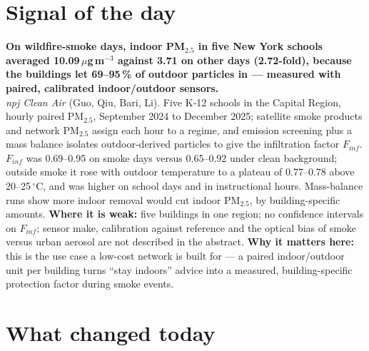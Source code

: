 \documentclass[10pt]{article}
\begin{document}
\vspace{6mm}

\section*{\sffamily\bfseries\color{Deep}Signal of the day}
\vspace{-1.5mm}{\color{Amber}\rule{\linewidth}{1.1pt}}\vspace{2.5mm}

\begin{keybox}
{\sffamily\bfseries\small\color{Deep}On wildfire-smoke days, indoor PM$_{2.5}$ in five New York schools averaged 10.09\,$\mu$g\,m$^{-3}$ against 3.71 on other days (2.72-fold), because the buildings let 69--95\,\% of outdoor particles in --- measured with paired, calibrated indoor/outdoor sensors.}\\[1.4mm]
\footnotesize
\textit{npj Clean Air} (Guo, Qiu, Bari, Li). Five K-12 schools in the Capital Region, hourly paired PM$_{2.5}$, September 2024 to December 2025; satellite smoke products and network PM$_{2.5}$ assign each hour to a regime, and emission screening plus a mass balance isolates outdoor-derived particles to give the infiltration factor $F_{inf}$. $F_{inf}$ was 0.69--0.95 on smoke days versus 0.65--0.92 under clean background; outside smoke it rose with outdoor temperature to a plateau of 0.77--0.78 above 20--25\,$^\circ$C, and was higher on school days and in instructional hours. Mass-balance runs show more indoor removal would cut indoor PM$_{2.5}$, by building-specific amounts.
\textbf{Where it is weak:} five buildings in one region; no confidence intervals on $F_{inf}$; sensor make, calibration against reference and the optical bias of smoke versus urban aerosol are not described in the abstract.
\textbf{Why it matters here:} this is the use case a low-cost network is built for --- a paired indoor/outdoor unit per building turns ``stay indoors'' advice into a measured, building-specific protection factor during smoke events.\par
\end{keybox}

\vspace{3mm}

\section*{\sffamily\bfseries\color{Deep}What changed today}
\vspace{-1.5mm}{\color{Amber}\rule{\linewidth}{1.1pt}}\vspace{2.5mm}
\end{document}
